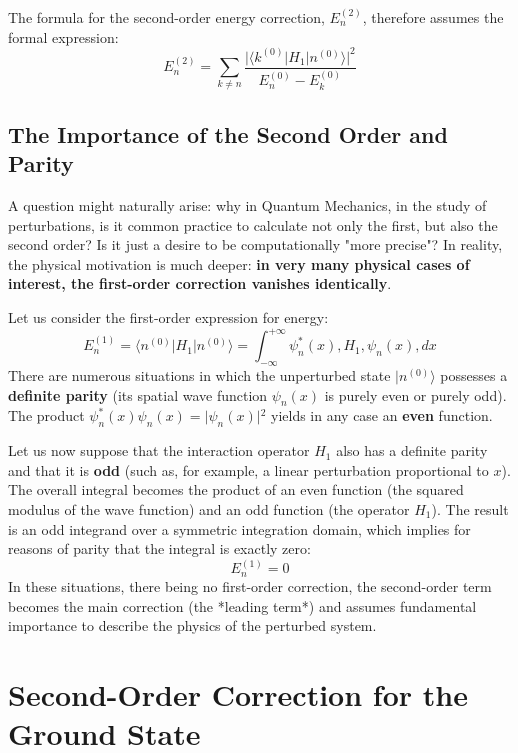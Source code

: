 The formula for the second-order energy correction, $E_n^{(2)}$, therefore assumes the formal expression:
\begin{equation}
E_n^{(2)} = \sum_{k \neq n} \frac{\big| \langle k^{(0)} | H_1 | n^{(0)} \rangle \big|^2}{E_n^{(0)} - E_k^{(0)}}
\end{equation}

\subsection{The Importance of the Second Order and Parity}
A question might naturally arise: why in Quantum Mechanics, in the study of perturbations, is it common practice to calculate not only the first, but also the second order? Is it just a desire to be computationally "more precise"? In reality, the physical motivation is much deeper: \textbf{in very many physical cases of interest, the first-order correction vanishes identically}.

Let us consider the first-order expression for energy:
\begin{equation}
E_n^{(1)} = \langle n^{(0)} | H_1 | n^{(0)} \rangle = \int_{-\infty}^{+\infty} \psi_n^*(x) , H_1 , \psi_n(x) , dx
\end{equation}
There are numerous situations in which the unperturbed state $\vert{}n^{(0)}\rangle$ possesses a \textbf{definite parity} (its spatial wave function $\psi_n(x)$ is purely even or purely odd). The product $\psi_n^*(x) \psi_n(x) = \vert{}\psi_n(x)\vert{}^2$ yields in any case an \textbf{even} function.

Let us now suppose that the interaction operator $H_1$ also has a definite parity and that it is \textbf{odd} (such as, for example, a linear perturbation proportional to $x$). The overall integral becomes the product of an even function (the squared modulus of the wave function) and an odd function (the operator $H_1$). The result is an odd integrand over a symmetric integration domain, which implies for reasons of parity that the integral is exactly zero:
\begin{equation}
E_n^{(1)} = 0
\end{equation}
In these situations, there being no first-order correction, the second-order term becomes the main correction (the *leading term*) and assumes fundamental importance to describe the physics of the perturbed system.

\section{Second-Order Correction for the Ground State}

